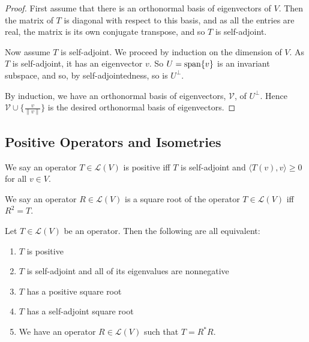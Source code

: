 \documentclass[]{article}
\begin{document}
\begin{proof}
		First assume that there is an orthonormal basis of eigenvectors of $V$. Then the matrix of $T$ is diagonal with respect to this basis, and as all the entries are real, the matrix is its own conjugate transpose, and so $T$ is self-adjoint.

		Now assume $T$ is self-adjoint. We proceed by induction on the dimension of $V$. As $T$ is self-adjoint, it has an eigenvector $v$. So $U = \operatorname{span}\{v\}$ is an invariant subspace, and so, by self-adjointedness, so is $U^{\perp}$. 

		By induction, we have an orthonormal basis of eigenvectors, $\mathcal{V}$, of $U^{\perp}$. Hence $\mathcal{V} \cup \{\frac{v}{\|v\|}\}$ is the desired orthonormal basis of eigenvectors.
\end{proof}

\subsection{Positive Operators and Isometries}

\begin{defi} 
		We say an operator $T \in \mathcal{L}(V)$ is positive iff $T$ is self-adjoint and $\langle T(v), v \rangle \geq 0$ for all $v \in V$.
\end{defi}

\begin{defi} 
		We say an operator $R \in \mathcal{L}(V)$ is a square root of the operator $T \in \mathcal{L}(V)$ iff $R^2 = T$.
\end{defi}

\begin{thm} 
		Let $T \in \mathcal{L}(V)$ be an operator. Then the following are all equivalent:
		\begin{enumerate}
				\item $T$ is positive
				\item $T$ is self-adjoint and all of its eigenvalues are nonnegative
				\item $T$ has a positive square root
				\item $T$ has a self-adjoint square root
				\item We have an operator $R \in \mathcal{L}(V)$ such that $T = R^*R$.
		\end{enumerate}
\end{thm}
\end{document}
